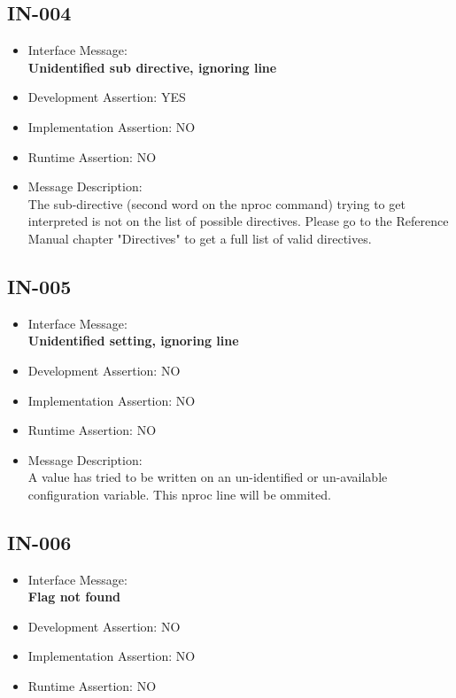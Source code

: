 \subsection{IN-004}
\begin{itemize}
  \item Interface Message:\\[1em]
    \textbf{Unidentified sub directive, ignoring line}
  \item Development Assertion: YES
  \item Implementation Assertion: NO
  \item Runtime Assertion: NO
  \item Message Description:\\[1em]
    The sub-directive (second word on the nproc command)  trying to get interpreted is not on the list of possible directives. Please go to the Reference Manual chapter "Directives" to get a full list of valid directives.
\end{itemize}

\subsection{IN-005}
\begin{itemize}
  \item Interface Message:\\[1em]
    \textbf{Unidentified setting, ignoring line}
  \item Development Assertion: NO
  \item Implementation Assertion: NO
  \item Runtime Assertion: NO
  \item Message Description:\\[1em]
    A value has tried to be written on an un-identified or un-available configuration variable. This nproc line will be ommited.
\end{itemize}

\subsection{IN-006}
\begin{itemize}
  \item Interface Message:\\[1em]
    \textbf{Flag not found}
  \item Development Assertion: NO
  \item Implementation Assertion: NO
  \item Runtime Assertion: NO
\end{itemize}

